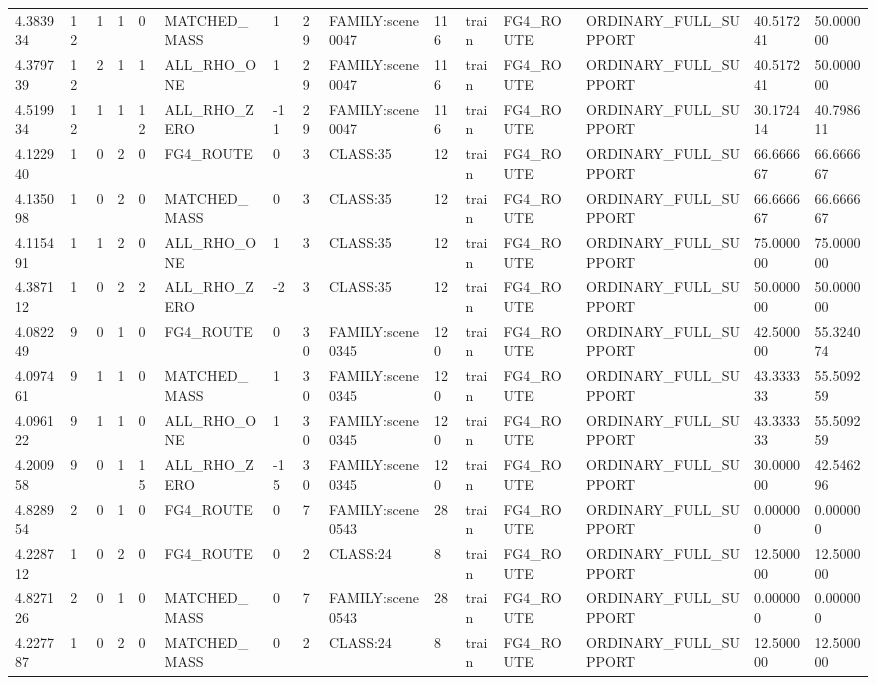 \begin{tabular}{lllllllllllllll}
4.383934 & 12 & 1 & 1 & 0 & MATCHED\_MASS & 1 & 29 & FAMILY:scene0047 & 116 & train & FG4\_ROUTE & ORDINARY\_FULL\_SUPPORT & 40.517241 & 50.000000 \\
4.379739 & 12 & 2 & 1 & 1 & ALL\_RHO\_ONE & 1 & 29 & FAMILY:scene0047 & 116 & train & FG4\_ROUTE & ORDINARY\_FULL\_SUPPORT & 40.517241 & 50.000000 \\
4.519934 & 12 & 1 & 1 & 12 & ALL\_RHO\_ZERO & -11 & 29 & FAMILY:scene0047 & 116 & train & FG4\_ROUTE & ORDINARY\_FULL\_SUPPORT & 30.172414 & 40.798611 \\
4.122940 & 1 & 0 & 2 & 0 & FG4\_ROUTE & 0 & 3 & CLASS:35 & 12 & train & FG4\_ROUTE & ORDINARY\_FULL\_SUPPORT & 66.666667 & 66.666667 \\
4.135098 & 1 & 0 & 2 & 0 & MATCHED\_MASS & 0 & 3 & CLASS:35 & 12 & train & FG4\_ROUTE & ORDINARY\_FULL\_SUPPORT & 66.666667 & 66.666667 \\
4.115491 & 1 & 1 & 2 & 0 & ALL\_RHO\_ONE & 1 & 3 & CLASS:35 & 12 & train & FG4\_ROUTE & ORDINARY\_FULL\_SUPPORT & 75.000000 & 75.000000 \\
4.387112 & 1 & 0 & 2 & 2 & ALL\_RHO\_ZERO & -2 & 3 & CLASS:35 & 12 & train & FG4\_ROUTE & ORDINARY\_FULL\_SUPPORT & 50.000000 & 50.000000 \\
4.082249 & 9 & 0 & 1 & 0 & FG4\_ROUTE & 0 & 30 & FAMILY:scene0345 & 120 & train & FG4\_ROUTE & ORDINARY\_FULL\_SUPPORT & 42.500000 & 55.324074 \\
4.097461 & 9 & 1 & 1 & 0 & MATCHED\_MASS & 1 & 30 & FAMILY:scene0345 & 120 & train & FG4\_ROUTE & ORDINARY\_FULL\_SUPPORT & 43.333333 & 55.509259 \\
4.096122 & 9 & 1 & 1 & 0 & ALL\_RHO\_ONE & 1 & 30 & FAMILY:scene0345 & 120 & train & FG4\_ROUTE & ORDINARY\_FULL\_SUPPORT & 43.333333 & 55.509259 \\
4.200958 & 9 & 0 & 1 & 15 & ALL\_RHO\_ZERO & -15 & 30 & FAMILY:scene0345 & 120 & train & FG4\_ROUTE & ORDINARY\_FULL\_SUPPORT & 30.000000 & 42.546296 \\
4.828954 & 2 & 0 & 1 & 0 & FG4\_ROUTE & 0 & 7 & FAMILY:scene0543 & 28 & train & FG4\_ROUTE & ORDINARY\_FULL\_SUPPORT & 0.000000 & 0.000000 \\
4.228712 & 1 & 0 & 2 & 0 & FG4\_ROUTE & 0 & 2 & CLASS:24 & 8 & train & FG4\_ROUTE & ORDINARY\_FULL\_SUPPORT & 12.500000 & 12.500000 \\
4.827126 & 2 & 0 & 1 & 0 & MATCHED\_MASS & 0 & 7 & FAMILY:scene0543 & 28 & train & FG4\_ROUTE & ORDINARY\_FULL\_SUPPORT & 0.000000 & 0.000000 \\
4.227787 & 1 & 0 & 2 & 0 & MATCHED\_MASS & 0 & 2 & CLASS:24 & 8 & train & FG4\_ROUTE & ORDINARY\_FULL\_SUPPORT & 12.500000 & 12.500000 \\

\end{tabular}
